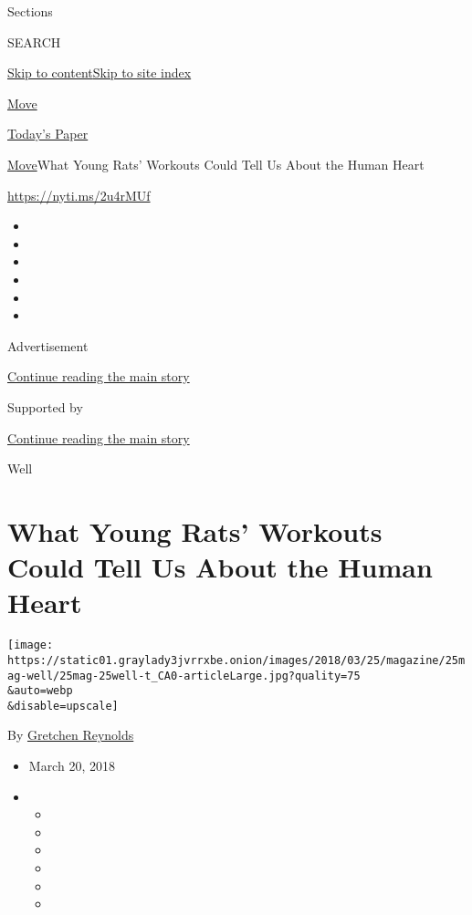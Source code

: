 Sections

SEARCH

\protect\hyperlink{site-content}{Skip to
content}\protect\hyperlink{site-index}{Skip to site index}

\href{https://www.nytimes3xbfgragh.onion/section/well/move}{Move}

\href{https://myaccount.nytimes3xbfgragh.onion/auth/login?response_type=cookie\&client_id=vi}{}

\href{https://www.nytimes3xbfgragh.onion/section/todayspaper}{Today's
Paper}

\href{/section/well/move}{Move}\textbar{}What Young Rats' Workouts Could
Tell Us About the Human Heart

\url{https://nyti.ms/2u4rMUf}

\begin{itemize}
\item
\item
\item
\item
\item
\item
\end{itemize}

Advertisement

\protect\hyperlink{after-top}{Continue reading the main story}

Supported by

\protect\hyperlink{after-sponsor}{Continue reading the main story}

Well

\hypertarget{what-young-rats-workouts-could-tell-us-about-the-human-heart}{%
\section{What Young Rats' Workouts Could Tell Us About the Human
Heart}\label{what-young-rats-workouts-could-tell-us-about-the-human-heart}}

\texttt{[image: https://static01.graylady3jvrrxbe.onion/images/2018/03/25/magazine/25mag-well/25mag-25well-t\_CA0-articleLarge.jpg?quality=75\\\&auto=webp\\\&disable=upscale]}

By
\href{https://www.nytimes3xbfgragh.onion/by/gretchen-reynolds}{Gretchen
Reynolds}

\begin{itemize}
\item
  March 20, 2018
\item
  \begin{itemize}
  \item
  \item
  \item
  \item
  \item
  \item
  \end{itemize}
\end{itemize}

